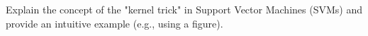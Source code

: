 Explain the concept of the "kernel trick" in Support Vector Machines (SVMs) and provide an intuitive example (e.g., using a figure).
